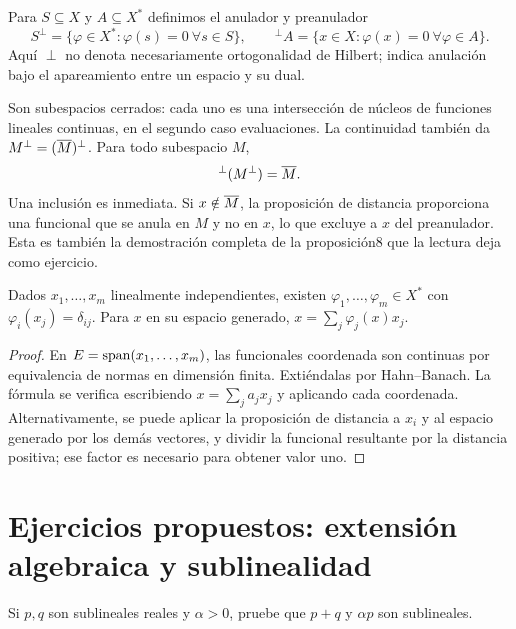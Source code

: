 \begin{definicion}
Para $S\subseteq X$ y $A\subseteq X^*$ definimos el anulador y preanulador
\[
 S^\perp=\{\varphi\in X^*: \varphi(s)=0\ \forall s\in S\},\qquad
 {}^\perp A=\{x\in X:\varphi(x)=0\ \forall\varphi\in A\}.
\]
Aquí $\perp$ no denota necesariamente ortogonalidad de Hilbert; indica anulación bajo el apareamiento entre un espacio y su dual.
\end{definicion}
Son subespacios cerrados: cada uno es una intersección de núcleos de funciones lineales continuas, en el segundo caso evaluaciones. La continuidad también da $M^\perp=(\overline{M})^\perp$. Para todo subespacio $M$,
\begin{equation}\label{v3:doble-anulador}
 {}^\perp(M^\perp)=\overline{M}.
\end{equation}
Una inclusión es inmediata. Si $x\notin\overline{M}$, la proposición de distancia proporciona una funcional que se anula en $M$ y no en $x$, lo que excluye a $x$ del preanulador. Esta es también la demostración completa de la proposición8 que la lectura deja como ejercicio.

\begin{proposicion}\label{v3:biortogonal}
Dados $x_1,\ldots,x_m$ linealmente independientes, existen $\varphi_1,\ldots,\varphi_m\in X^*$ con $\varphi_i(x_j)=\delta_{ij}$. Para $x$ en su espacio generado, $x=\sum_j\varphi_j(x)x_j$.
\end{proposicion}
\begin{proof}
En $E=\operatorname{span}(x_1,\ldots,x_m)$, las funcionales coordenada son continuas por equivalencia de normas en dimensión finita. Extiéndalas por Hahn--Banach. La fórmula se verifica escribiendo $x=\sum_ja_jx_j$ y aplicando cada coordenada. Alternativamente, se puede aplicar la proposición de distancia a $x_i$ y al espacio generado por los demás vectores, y dividir la funcional resultante por la distancia positiva; ese factor es necesario para obtener valor uno.
\end{proof}

\section{Ejercicios propuestos: extensión algebraica y sublinealidad}
\begin{ejercicio}\label{ej:v3-l01-1}
Si $p,q$ son sublineales reales y $\alpha>0$, pruebe que $p+q$ y $\alpha p$ son sublineales.
\end{ejercicio}

